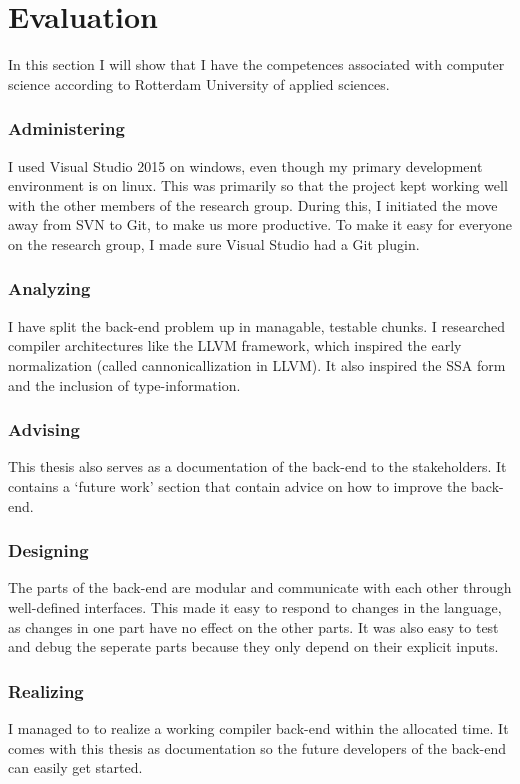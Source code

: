 \section{Evaluation}\label{evaluation}
In this section I will show that I have the competences associated with computer science according to Rotterdam University of applied sciences.

\subsubsection{Administering} 
I used Visual Studio 2015 on windows, even though my primary development environment is on linux.
This was primarily so that the project kept working well with the other members of the research group.
During this, I initiated the move away from SVN to Git, to make us more productive.
To make it easy for everyone on the research group, I made sure Visual Studio had a Git plugin.

\subsubsection{Analyzing}
I have split the back-end problem up in managable, testable chunks.
I researched compiler architectures like the LLVM framework, which inspired the early normalization (called cannonicallization in LLVM).
It also inspired the SSA form and the inclusion of type-information.

\subsubsection{Advising}
This thesis also serves as a documentation of the back-end to the stakeholders.
It contains a `future work' section that contain advice on how to improve the back-end.

\subsubsection{Designing}
The parts of the back-end are modular and communicate with each other through well-defined interfaces.
This made it easy to respond to changes in the language, as changes in one part have no effect on the other parts.
It was also easy to test and debug the seperate parts because they only depend on their explicit inputs.

\subsubsection{Realizing}
I managed to to realize a working compiler back-end within the allocated time.
It comes with this thesis as documentation so the future developers of the back-end can easily get started.

